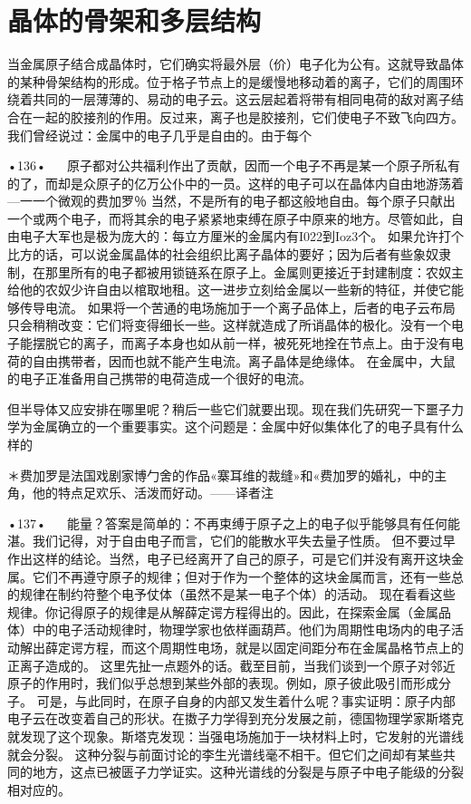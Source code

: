 \section{晶体的骨架和多层结构}

当金属原子结合成晶体时，它们确实将最外层（价）电子化为公有。这就导致晶体的某种骨架结构的形成。位于格子节点上的是缓慢地移动着的离子，它们的周围环绕着共同的一层薄薄的、易动的电子云。这云层起着将带有相同电荷的敌对离子结合在一起的胶接剂的作用。反过来，离子也是胶接剂，它们使电子不致飞向四方。
我们曾经说过：金属中的电子几乎是自由的。由于每个

•136•
  
原子都对公共福利作出了贡献，因而一个电子不再是某一个原子所私有的了，而却是众原子的亿万公仆中的一员。这样的电子可以在晶体内自由地游荡着—一一个微观的费加罗％
当然，不是所有的电子都这般地自由。每个原子只献出一个或两个电子，而将其余的电子紧紧地束缚在原子中原来的地方。尽管如此，自由电子大军也是极为庞大的：每立方厘米的金属内有I022到Ioz3个。
如果允许打个比方的话，可以说金属晶体的社会组织比离子晶体的要好；因为后者有些象奴隶制，在那里所有的电子都被用锁链系在原子上。金属则更接近于封建制度：农奴主给他的农奴少许自由以棺取地租。这一进步立刻给金属以一些新的特征，并使它能够传导电流。
如果将一个苦通的电场施加于一个离子品体上，后者的电子云布局只会稍稍改变：它们将变得细长一些。这样就造成了所诮晶体的极化。没有一个电子能摆脱它的离子，而离子本身也如从前一样，被死死地拴在节点上。由于没有电荷的自由携带者，因而也就不能产生电流。离子晶体是绝缘体。
在金属中，大鼠的电子正准备用自己携带的电荷造成一个很好的电流。

但半导体又应安排在哪里呢？稍后一些它们就要出现。现在我们先研究一下噩子力学为金属确立的一个重要事实。这个问题是：金属中好似集体化了的电子具有什么样的

＊费加罗是法国戏剧家博勹舍的作品«寨耳维的裁缝»和«费加罗的婚礼，中的主角，他的特点足欢乐、活泼而好动。——译者注

•137•
  
能量？答案是简单的：不再束缚于原子之上的电子似乎能够具有任何能湛。我们记得，对于自由电子而言，它们的能散水平失去量子性质。
但不要过早作出这样的结论。当然，电子已经离开了自己的原子，可是它们并没有离开这块金属。它们不再遵守原子的规律；但对于作为一个整体的这块金属而言，还有一些总的规律在制约符整个电予仗体（虽然不是某一电子个体）的活动。
现在看看这些规律。你记得原子的规律是从解薛定谔方程得出的。因此，在探索金属（金属品体）中的电子活动规律时，物理学家也依样画葫芦。他们为周期性电场内的电子活动解出薛定谔方程，而这个周期性电场，就是以固定间距分布在金属晶格节点上的正离子造成的。
这里先扯一点题外的话。截至目前，当我们谈到一个原子对邻近原子的作用时，我们似乎总想到某些外部的表现。例如，原子彼此吸引而形成分子。
可是，与此同时，在原子自身的内部又发生着什么呢？事实证明：原子内部电子云在改变着自己的形状。在擞子力学得到充分发展之前，德国物理学家斯塔克就发现了这个现象。斯塔克发现：当强电场施加于一块材料上时，它发射的光谱线就会分裂。
这种分裂与前面讨论的李生光谱线毫不相干。但它们之间却有某些共同的地方，这点已被匮子力学证实。这种光谱线的分裂是与原子中电子能级的分裂相对应的。

